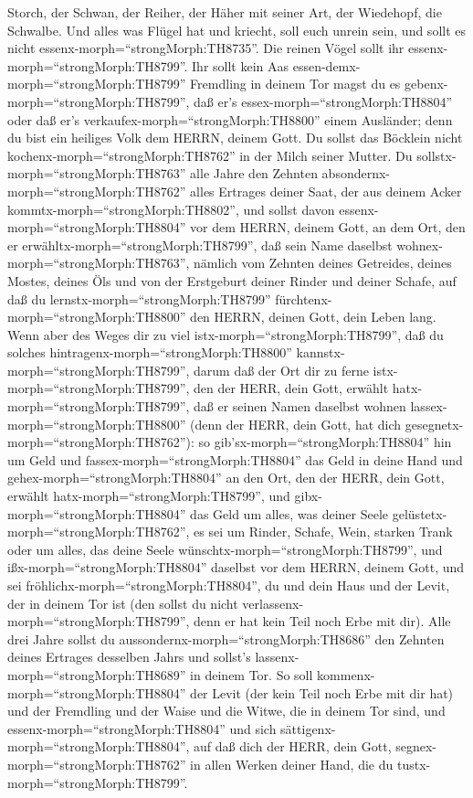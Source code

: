Storch, der Schwan,  der Reiher, der Häher mit seiner Art,
der Wiedehopf, die Schwalbe.  Und alles was Flügel hat und
kriecht, soll euch unrein sein, und sollt es nicht
essenx-morph=``strongMorph:TH8735''.  Die reinen Vögel
sollt ihr essenx-morph=``strongMorph:TH8799''.  Ihr sollt
kein Aas essen-demx-morph=``strongMorph:TH8799'' Fremdling in deinem Tor
magst du es gebenx-morph=``strongMorph:TH8799'', daß er's
essex-morph=``strongMorph:TH8804'' oder daß er's
verkaufex-morph=``strongMorph:TH8800'' einem Ausländer; denn du bist ein
heiliges Volk dem HERRN, deinem Gott. Du sollst das Böcklein nicht
kochenx-morph=``strongMorph:TH8762'' in der Milch seiner Mutter.
 Du sollstx-morph=``strongMorph:TH8763'' alle Jahre den
Zehnten absondernx-morph=``strongMorph:TH8762'' alles Ertrages deiner
Saat, der aus deinem Acker kommtx-morph=``strongMorph:TH8802'',
 und sollst davon essenx-morph=``strongMorph:TH8804'' vor
dem HERRN, deinem Gott, an dem Ort, den er
erwähltx-morph=``strongMorph:TH8799'', daß sein Name daselbst
wohnex-morph=``strongMorph:TH8763'', nämlich vom Zehnten deines
Getreides, deines Mostes, deines Öls und von der Erstgeburt deiner
Rinder und deiner Schafe, auf daß du
lernstx-morph=``strongMorph:TH8799''
fürchtenx-morph=``strongMorph:TH8800'' den HERRN, deinen Gott, dein
Leben lang.  Wenn aber des Weges dir zu viel
istx-morph=``strongMorph:TH8799'', daß du solches
hintragenx-morph=``strongMorph:TH8800''
kannstx-morph=``strongMorph:TH8799'', darum daß der Ort dir zu ferne
istx-morph=``strongMorph:TH8799'', den der HERR, dein Gott, erwählt
hatx-morph=``strongMorph:TH8799'', daß er seinen Namen daselbst wohnen
lassex-morph=``strongMorph:TH8800'' (denn der HERR, dein Gott, hat dich
gesegnetx-morph=``strongMorph:TH8762''):  so
gib'sx-morph=``strongMorph:TH8804'' hin um Geld und
fassex-morph=``strongMorph:TH8804'' das Geld in deine Hand und
gehex-morph=``strongMorph:TH8804'' an den Ort, den der HERR, dein Gott,
erwählt hatx-morph=``strongMorph:TH8799'',  und
gibx-morph=``strongMorph:TH8804'' das Geld um alles, was deiner Seele
gelüstetx-morph=``strongMorph:TH8762'', es sei um Rinder, Schafe, Wein,
starken Trank oder um alles, das deine Seele
wünschtx-morph=``strongMorph:TH8799'', und
ißx-morph=``strongMorph:TH8804'' daselbst vor dem HERRN, deinem Gott,
und sei fröhlichx-morph=``strongMorph:TH8804'', du und dein Haus
 und der Levit, der in deinem Tor ist (den sollst du nicht
verlassenx-morph=``strongMorph:TH8799'', denn er hat kein Teil noch Erbe
mit dir).  Alle drei Jahre sollst du
aussondernx-morph=``strongMorph:TH8686'' den Zehnten deines Ertrages
desselben Jahrs und sollst's lassenx-morph=``strongMorph:TH8689'' in
deinem Tor.  So soll kommenx-morph=``strongMorph:TH8804''
der Levit (der kein Teil noch Erbe mit dir hat) und der Fremdling und
der Waise und die Witwe, die in deinem Tor sind, und
essenx-morph=``strongMorph:TH8804'' und sich
sättigenx-morph=``strongMorph:TH8804'', auf daß dich der HERR, dein
Gott, segnex-morph=``strongMorph:TH8762'' in allen Werken deiner Hand,
die du tustx-morph=``strongMorph:TH8799''.

